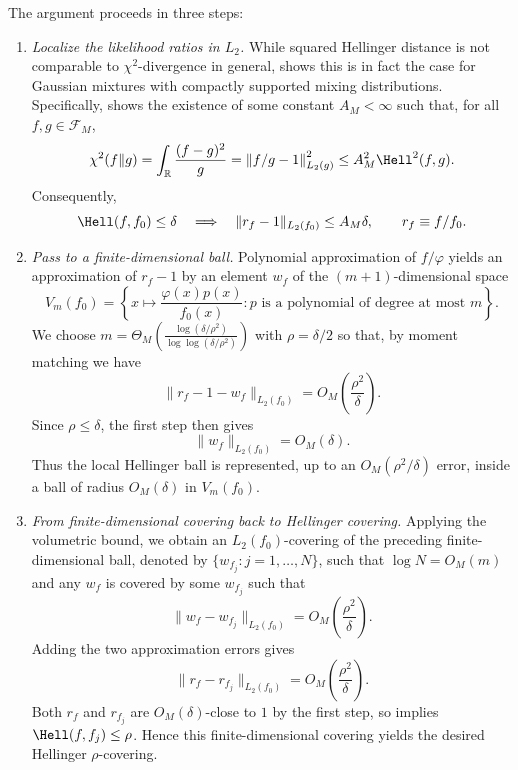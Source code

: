 \documentclass[letterpaper,11pt]{article}
\newcommand{\calF}{{\mathcal{F}}}
\theoremstyle{definition}
\begin{document}
The argument proceeds in three steps:
\begin{enumerate}[wide]
\item \emph{Localize the likelihood ratios in $L_2$.}
While squared Hellinger distance is not comparable to $\chi^2$-divergence in general, 
\cite{jia.polyanskiy.wu.2023} shows this is in fact the case for Gaussian mixtures with compactly supported mixing distributions.
Specifically, 
\cite[Theorem~21]{jia.polyanskiy.wu.2023} shows the existence of some constant $A_M<\infty$ such
that, for all $f,g\in\calF_M$,
\begin{equation}
\label{eq:compact-chi2-hellinger}
\chi^2(f\|g)
=
\int_{\mathbb R}\frac{(f-g)^2}{g}
=
\left\|f/g-1\right\|_{L_2(g)}^2
\le
A_M^2\Hell^2(f,g).
\end{equation}
Consequently,
\[
\Hell(f,f_0)\le\delta
\quad\Longrightarrow\quad
\|r_f-1\|_{L_2(f_0)}\le A_M\delta, \qquad r_f \equiv f/f_0.
\]

\item \emph{Pass to a finite-dimensional ball.}
Polynomial approximation of $f/\varphi$ yields an approximation of $r_f-1$ by
an element $w_f$ of the $(m+1)$-dimensional space
\begin{equation}
V_m(f_0)
=
\left\{
x\mapsto\frac{\varphi(x)p(x)}{f_0(x)}
:
p\text{ is a polynomial of degree at most }m
\right\}.
\label{eq:Vm}
\end{equation}
We choose $m = \Theta_M(\frac{\log (\delta/\rho^2)}{\log\log(\delta/\rho^2)})$ with $\rho
= \delta/2$ so that, by moment matching we have
\[
\|r_f-1-w_f\|_{L_2(f_0)}
=O_M\left(\frac{\rho^2}{\delta}\right).
\]
Since $\rho\le\delta$, the first step then gives
\[
\|w_f\|_{L_2(f_0)}=O_M(\delta).
\]
Thus the local Hellinger ball is represented, up to an
$O_M(\rho^2/\delta)$ error, inside a ball of radius $O_M(\delta)$ in
$V_m(f_0)$.

\item \emph{From finite-dimensional covering back to Hellinger covering.}
Applying the volumetric bound, we obtain an $L_2(f_0)$-covering of the preceding finite-dimensional ball, denoted by $\{w_{f_j}: j=1,\ldots,N\}$, such that 
$\log N = O_M(m)$ and any $w_f$ is covered by some $w_{f_j}$ such that
\[
\|w_f-w_{f_j}\|_{L_2(f_0)}
=O_M\left(\frac{\rho^2}{\delta}\right).
\]
Adding the two approximation errors gives
\[
\|r_f-r_{f_j}\|_{L_2(f_0)}
=O_M\left(\frac{\rho^2}{\delta}\right).
\]
Both $r_f$ and $r_{f_j}$ are
$O_M(\delta)$-close to $1$ by the first step, so
 implies $\Hell(f,f_j)\le\rho$.  Hence this
finite-dimensional covering yields the desired Hellinger $\rho$-covering.
\end{enumerate}
\end{document}
